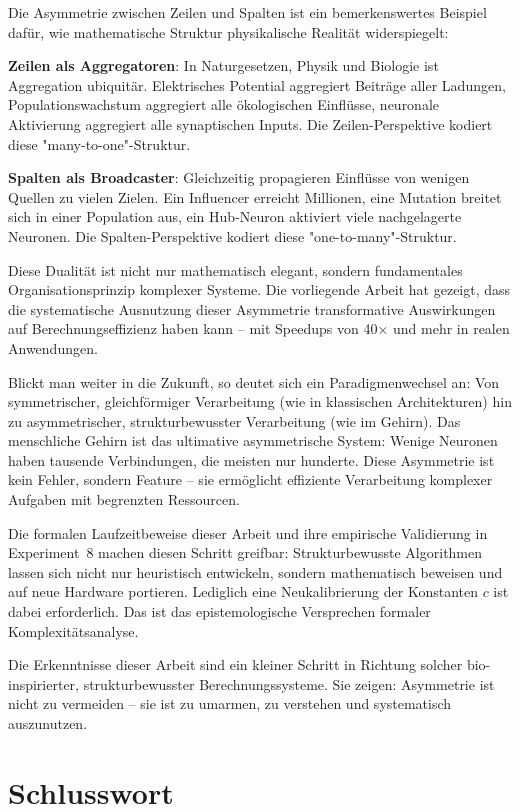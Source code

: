 \documentclass[a4paper,12pt]{report}
\theoremstyle{definition}
\begin{document}
	Die Asymmetrie zwischen Zeilen und Spalten ist ein bemerkenswertes Beispiel dafür, wie mathematische Struktur physikalische Realität widerspiegelt:
	
	\textbf{Zeilen als Aggregatoren}: In Naturgesetzen, Physik und Biologie ist Aggregation ubiquitär. Elektrisches Potential aggregiert Beiträge aller Ladungen, Populationswachstum aggregiert alle ökologischen Einflüsse, neuronale Aktivierung aggregiert alle synaptischen Inputs. Die Zeilen-Perspektive kodiert diese "many-to-one"-Struktur.
	
	\textbf{Spalten als Broadcaster}: Gleichzeitig propagieren Einflüsse von wenigen Quellen zu vielen Zielen. Ein Influencer erreicht Millionen, eine Mutation breitet sich in einer Population aus, ein Hub-Neuron aktiviert viele nachgelagerte Neuronen. Die Spalten-Perspektive kodiert diese "one-to-many"-Struktur.
	
	Diese Dualität ist nicht nur mathematisch elegant, sondern fundamentales Organisationsprinzip komplexer Systeme. Die vorliegende Arbeit hat gezeigt, dass die systematische Ausnutzung dieser Asymmetrie transformative Auswirkungen auf Berechnungseffizienz haben kann – mit Speedups von 40× und mehr in realen Anwendungen.
	
	Blickt man weiter in die Zukunft, so deutet sich ein Paradigmenwechsel an: Von symmetrischer, gleichförmiger Verarbeitung (wie in klassischen Architekturen) hin zu asymmetrischer, strukturbewusster Verarbeitung (wie im Gehirn). Das menschliche Gehirn ist das ultimative asymmetrische System: Wenige Neuronen haben tausende Verbindungen, die meisten nur hunderte. Diese Asymmetrie ist kein Fehler, sondern Feature – sie ermöglicht effiziente Verarbeitung komplexer Aufgaben mit begrenzten Ressourcen.
	
	Die formalen Laufzeitbeweise dieser Arbeit und ihre empirische Validierung in Experiment~8 machen diesen Schritt greifbar: Strukturbewusste Algorithmen lassen sich nicht nur heuristisch entwickeln, sondern mathematisch beweisen und auf neue Hardware portieren. Lediglich eine Neukalibrierung der Konstanten $c$ ist dabei erforderlich. Das ist das epistemologische Versprechen formaler Komplexitätsanalyse.

	Die Erkenntnisse dieser Arbeit sind ein kleiner Schritt in Richtung solcher bio-inspirierter, strukturbewusster Berechnungssysteme. Sie zeigen: Asymmetrie ist nicht zu vermeiden – sie ist zu umarmen, zu verstehen und systematisch auszunutzen.
	
	\section{Schlusswort}
	
\end{document}
